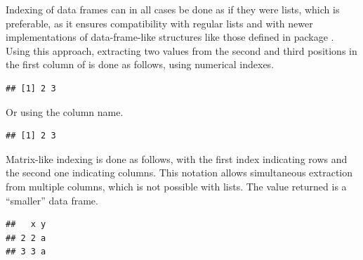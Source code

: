 \documentclass[krantz2]{krantz}\usepackage{knitr}
\begin{document}
\begin{explainbox}
Indexing of data frames can in all cases be done as if they were lists, which is preferable, as it ensures compatibility with regular \Rlang lists and with newer implementations of data-frame-like structures like those defined in package . Using this approach, extracting two values from the second and third positions in the first column of  is done as follows, using numerical indexes.

\begin{knitrout}\footnotesize
{}\color{fgcolor}\begin{kframe}
\begin{alltt}
\hlstd{a.df[[}\hlstd{]][}\hlopt{:}\hlstd{]}
\end{alltt}
\begin{verbatim}
## [1] 2 3
\end{verbatim}
\end{kframe}
\end{knitrout}

Or using the column name.

\begin{knitrout}\footnotesize
{}\color{fgcolor}\begin{kframe}
\begin{alltt}
\hlstd{a.df[[}\hlstd{]][}\hlopt{:}\hlstd{]}
\end{alltt}
\begin{verbatim}
## [1] 2 3
\end{verbatim}
\end{kframe}
\end{knitrout}

Matrix-like indexing is done as follows, with the first index indicating rows and the second one indicating columns. This notation allows simultaneous extraction from multiple columns, which is not possible with lists. The value returned is a ``smaller'' data frame.

\begin{knitrout}\footnotesize
{}\color{fgcolor}\begin{kframe}
\begin{alltt}
\hlstd{a.df[}\hlopt{:}\hlstd{,} \hlopt{:}\hlstd{]}
\end{alltt}
\begin{verbatim}
##   x y
## 2 2 a
## 3 3 a
\end{verbatim}
\end{kframe}
\end{knitrout}


\end{explainbox}
\end{document}
